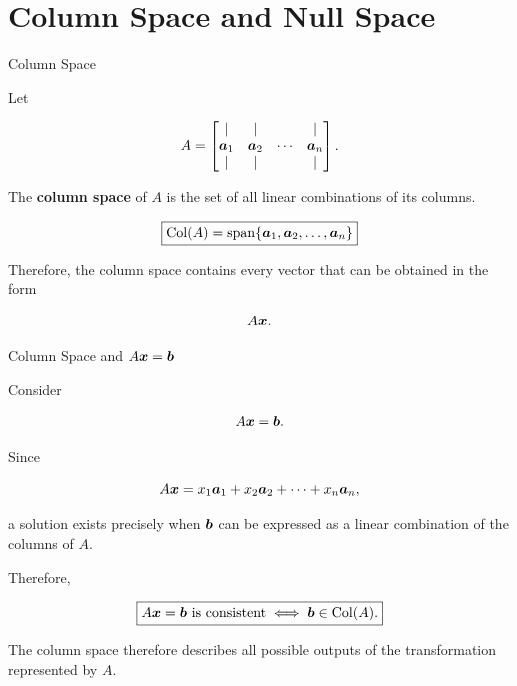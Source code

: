 

\section{Column Space and Null Space}


\begin{frame}{Column Space}

Let

\[
A=
\begin{bmatrix}
|&|& &|\\
\bm{a}_1&\bm{a}_2&\cdots&\bm{a}_n\\
|&|& &|
\end{bmatrix}.
\]

The \textbf{column space} of $A$ is the set of all
linear combinations of its columns.

\[
\boxed{
\operatorname{Col}(A)
=
\operatorname{span}
\{\bm{a}_1,\bm{a}_2,\ldots,\bm{a}_n\}
}
\]

\vspace{0.4cm}

Therefore, the column space contains every vector that can be
obtained in the form

\[
A\bm{x}.
\]

\end{frame}



\begin{frame}{Column Space and $A\bm{x}=\bm{b}$}

Consider

\[
A\bm{x}=\bm{b}.
\]

Since

\[
A\bm{x}
=
x_1\bm{a}_1+
x_2\bm{a}_2+\cdots+x_n\bm{a}_n,
\]

a solution exists precisely when $\bm{b}$ can be expressed
as a linear combination of the columns of $A$.

Therefore,

\[
\boxed{
A\bm{x}=\bm{b}
\text{ is consistent}
\iff
\bm{b}\in\operatorname{Col}(A).
}
\]

The column space therefore describes all possible outputs of
the transformation represented by $A$.

\end{frame}


